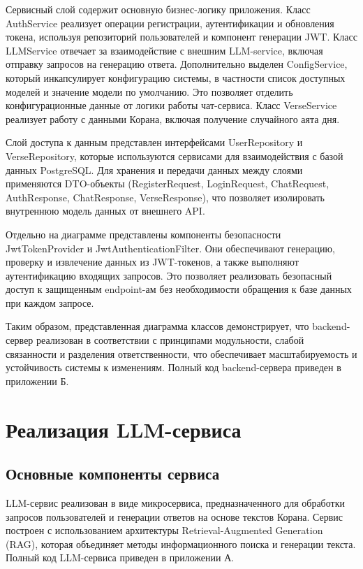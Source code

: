 Сервисный слой содержит основную бизнес-логику приложения. Класс AuthService реализует операции регистрации, аутентификации и обновления токена, используя репозиторий пользователей и компонент генерации JWT. Класс LLMService отвечает за взаимодействие с внешним LLM-service, включая отправку запросов на генерацию ответа. Дополнительно выделен ConfigService, который инкапсулирует конфигурацию системы, в частности список доступных моделей и значение модели по умолчанию. Это позволяет отделить конфигурационные данные от логики работы чат-сервиса. Класс VerseService реализует работу с данными Корана, включая получение случайного аята дня.


Слой доступа к данным представлен интерфейсами UserRepository и VerseRepository, которые используются сервисами для взаимодействия с базой данных PostgreSQL. Для хранения и передачи данных между слоями применяются DTO-объекты (RegisterRequest, LoginRequest, ChatRequest, AuthResponse, ChatResponse, VerseResponse), что позволяет изолировать внутреннюю модель данных от внешнего API.


Отдельно на диаграмме представлены компоненты безопасности JwtTokenProvider и JwtAuthenticationFilter. Они обеспечивают генерацию, проверку и извлечение данных из JWT-токенов, а также выполняют аутентификацию входящих запросов. Это позволяет реализовать безопасный доступ к защищенным endpoint-ам без необходимости обращения к базе данных при каждом запросе.


Таким образом, представленная диаграмма классов демонстрирует, что backend-сервер реализован в соответствии с принципами модульности, слабой связанности и разделения ответственности, что обеспечивает масштабируемость и устойчивость системы к изменениям. Полный код backend-сервера приведен в приложении Б.


\section{Реализация LLM-сервиса}


\subsection{Основные компоненты сервиса}


LLM-сервис реализован в виде микросервиса, предназначенного для обработки запросов пользователей и генерации ответов на основе текстов Корана. Сервис построен с использованием архитектуры Retrieval-Augmented Generation (RAG), которая объединяет методы информационного поиска и генерации текста. Полный код LLM-сервиса приведен в приложении А.


